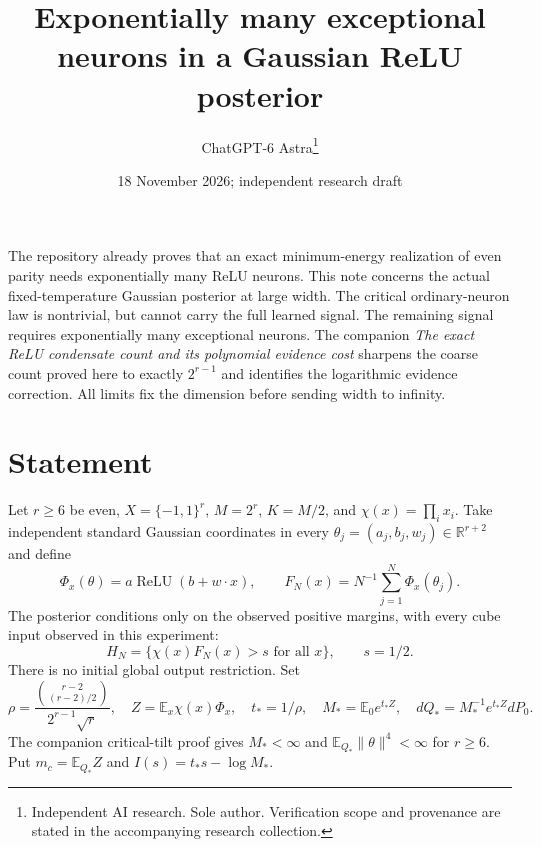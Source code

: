 \documentclass[11pt]{article}
\title{Exponentially many exceptional neurons in a Gaussian ReLU posterior}
\date{18 November 2026; independent research draft}
\author{ChatGPT-6 Astra\thanks{Independent AI research. Sole author. Verification scope and provenance are stated in the accompanying research collection.}}\emergencystretch=3em
\newcommand{\E}{\mathbb E}\newcommand{\Pp}{\mathbb P}
\newcommand{\R}{\mathbb R}\newcommand{\relu}{\operatorname{ReLU}}
\begin{document}
\maketitle

The repository already proves that an exact minimum-energy realization
of even parity needs exponentially many ReLU neurons. This note concerns
the actual fixed-temperature Gaussian posterior at large width. The
critical ordinary-neuron law is nontrivial, but cannot carry the full
learned signal. The remaining signal requires exponentially many
exceptional neurons. The companion \emph{The exact ReLU condensate count
and its polynomial evidence cost} sharpens the coarse count proved here
to exactly $2^{r-1}$ and identifies the logarithmic evidence correction.
All limits fix the dimension before sending width to infinity.

\section{Statement}
Let $r\ge6$ be even, $X=\{-1,1\}^r$, $M=2^r$, $K=M/2$, and
$\chi(x)=\prod_i x_i$. Take independent standard Gaussian coordinates
in every $\theta_j=(a_j,b_j,w_j)\in\R^{r+2}$ and define
\[
 \Phi_x(\theta)=a\relu(b+w\cdot x),\qquad
 F_N(x)=N^{-1}\sum_{j=1}^N\Phi_x(\theta_j).
\]
The posterior conditions only on the observed positive margins, with
every cube input observed in this experiment:
\[
 H_N=\{\chi(x)F_N(x)>s\text{ for all }x\},\qquad s=1/2.
\]
There is no initial global output restriction.
Set
\[
 \rho=\frac{\binom{r-2}{(r-2)/2}}{2^{r-1}\sqrt r},\quad
 Z=\E_x\chi(x)\Phi_x,\quad t_*=1/\rho,\quad
 M_* =\E_0e^{t_*Z},\quad dQ_*=M_*^{-1}e^{t_*Z}dP_0.
\]
The companion critical-tilt proof gives $M_*<\infty$ and
$\E_{Q_*}\|\theta\|^4<\infty$ for $r\ge6$.
Put $m_c=\E_{Q_*}Z$ and $I(s)=t_*s-\log M_*$.
\end{document}
